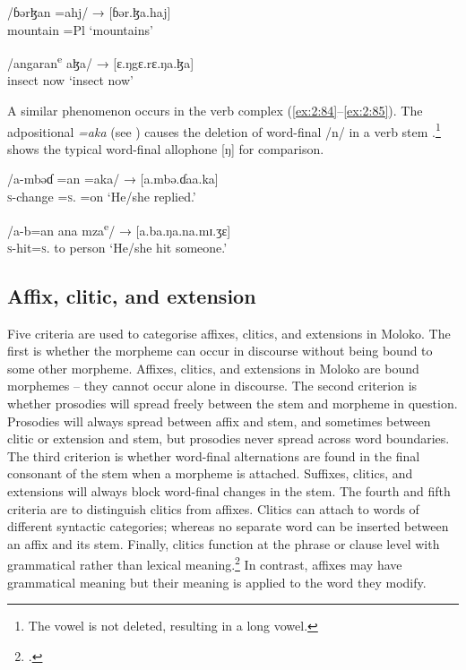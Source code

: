 \ea \label{ex:2:82}
\gll   /ɓərɮan =ahj/  →  [ɓər.ɮa.haj]\\
       mountain =Pl   {} ‘mountains’\\
\z

\ea \label{ex:2:83}
\gll /angaran\textsuperscript{e}    aɮa/ \hspace{11pt} → [ɛ.ŋgɛ.rɛ.ŋa.ɮa]\\
      insect     now {} {} {‘insect now’}\\
\z

A similar phenomenon occurs in the verb complex (\ref{ex:2:84}--\ref{ex:2:85}). The adpositional \textit{=aka} (see ) causes the deletion of word-final /n/ in a verb stem .\footnote{The vowel is not deleted, resulting in a long vowel. }  shows the typical word-final allophone [ŋ] for comparison. 

\ea \label{ex:2:84}
\gll /a-mbəɗ                           =an                               =aka/   →   [a.mbə.ɗaa.ka]\\
     \textsc{s}-change =\textsc{s}.{\IO} =on     {}  {‘He/she replied.’}\\
\z

\ea \label{ex:2:85}
\gll /a-b=an        ana  mza\textsuperscript{e}/       →   [a.ba.ŋa.na.mɪ.ʒɛ]\\
     \textsc{s}-hit=\textsc{s}.{\IO}  to    person {} {‘He/she hit someone.’}\\
\z

\subsection{Affix, clitic, and extension}\label{sec:2.6.2}
\hypertarget{RefHeading1210781525720847}{}
Five criteria are used to categorise affixes, clitics, and extensions in Moloko. The first is whether the morpheme can occur in discourse without being bound to some other morpheme. Affixes, clitics, and extensions in Moloko are bound morphemes -- they cannot occur alone in discourse. The second criterion is whether prosodies will spread freely between the stem and morpheme in question. Prosodies will always spread between affix and stem, and sometimes between clitic or extension and stem, but prosodies never spread across word boundaries. The third criterion is whether word-final alternations are found in the final consonant of the stem when a morpheme is attached. Suffixes, clitics, and extensions will always block word-final changes in the stem. The fourth and fifth criteria are to distinguish clitics from affixes. Clitics can attach to words of different syntactic categories; whereas no separate word can be inserted between an affix and its stem. Finally, clitics function at the phrase or clause level with grammatical rather than lexical meaning.\footnote{\citet[22]{Payne1997}.} In contrast, affixes may have grammatical meaning but their meaning is applied to the word they modify. 

